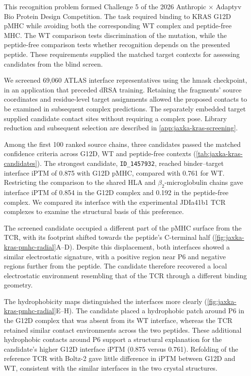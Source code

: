 This recognition problem formed Challenge 5 of the 2026 Anthropic $\times$ Adaptyv Bio Protein Design Competition. The task required binding to KRAS G12D pMHC while avoiding both the corresponding WT complex and peptide-free MHC.\supercite{anthropicAdaptyvKRASChallenge2026} The WT comparison tests discrimination of the mutation, while the peptide-free comparison tests whether recognition depends on the presented peptide. These requirements supplied the matched target contexts for assessing candidates from the blind screen.

We screened 69,060 ATLAS interface representatives using the hmask checkpoint, in an application that preceded dRSA training. Retaining the fragments' source coordinates and residue-level target assignments allowed the proposed contacts to be examined in subsequent complex predictions. The separately embedded target supplied candidate contact sites without requiring a complex pose. Library reduction and subsequent selection are described in \cref{app:jaxka-kras-screening}.

Among the first 100 ranked source chains, three candidates passed the matched confidence criteria across G12D, WT and peptide-free contexts (\cref{tab:jaxka-kras-candidates}). The strongest candidate, \texttt{ID\_1457932}, reached binder--target interface iPTM of 0.875 with G12D pMHC, compared with 0.761 for WT. Restricting the comparison to the shared HLA and $\beta_2$-microglobulin chains gave interface iPTM of 0.854 in the G12D complex and 0.192 in the peptide-free complex. We compared its interface with the experimental JDIa41b1 TCR complexes to examine the structural basis of this preference.

The screened candidate occupied a different part of the pMHC surface from the TCR, with its footprint shifted towards the peptide's C-terminal half (\cref{fig:jaxka-kras-pmhc-radial}A--D). Despite this displacement, both interfaces showed a similar electrostatic signature, with a positive region near P6 and negative regions further from the peptide. The candidate therefore recovered a local electrostatic environment resembling that of the TCR through a different binding geometry.

The hydrophobicity maps distinguished the interfaces more clearly (\cref{fig:jaxka-kras-pmhc-radial}E--H). The candidate placed a hydrophobic patch around P6 in the G12D complex that was absent from its WT interface, whereas the TCR retained similar contact environments across the two peptides. These additional hydrophobic contacts around P6 support a structural explanation for the candidate's higher G12D interface iPTM (0.875 versus 0.761).
Refolding of the reference TCR with Boltz-2 gave little difference in iPTM between G12D and WT, consistent with the similar interfaces in the two crystal structures.

